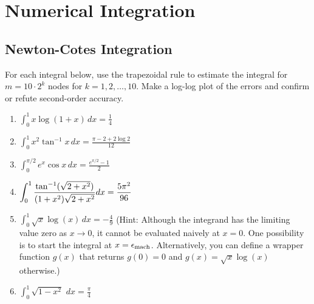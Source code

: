 \section{Numerical Integration}

\subsection{Newton-Cotes Integration}

\begin{exercise}\label{ex:integrals}
	For each integral below, use the trapezoidal rule to estimate the integral
	for $m=10\cdot 2^k$ nodes for $k=1,2,\ldots,10$. Make a log-log plot of the
	errors and confirm or refute second-order accuracy.
	\begin{enumerate}
		\item $\displaystyle \int_0^1 x\log(1+x)\, dx = \frac{1}{4}$

		\item $\displaystyle \int_0^1 x^2 \tan^{-1}x\, dx = \frac{\pi-2+2\log 2}{12}$

		\item $\displaystyle \int_0^{\pi/2}e^x \cos x\, dx = \frac{e^{\pi/2}-1}{2}$

		\item $\displaystyle \int_0^1 {\tan^{-1}(\sqrt{2+x^2})\over
				      (1+x^2)\sqrt{2+x^2}}dx={5\pi^2\over 96}$

		\item $\displaystyle \int_0^1 \sqrt{x} \log(x) \, dx = -\frac{4}{9}$
		      (Hint: Although the integrand has the limiting value zero as $x\to 0$,
		      it cannot be evaluated naively at $x=0$. One possibility is to start the
		      integral at $x=\epsilon_{\rm mach}$. Alternatively, you can define a
		      wrapper function $g(x)$ that returns $g(0)=0$ and $g(x)=\sqrt{x}\log(x)$
		      otherwise.)

		\item $\displaystyle \int_0^1 \sqrt{1-x^2}\,\, dx = \frac{\pi}{4}$
	\end{enumerate}
\end{exercise}

